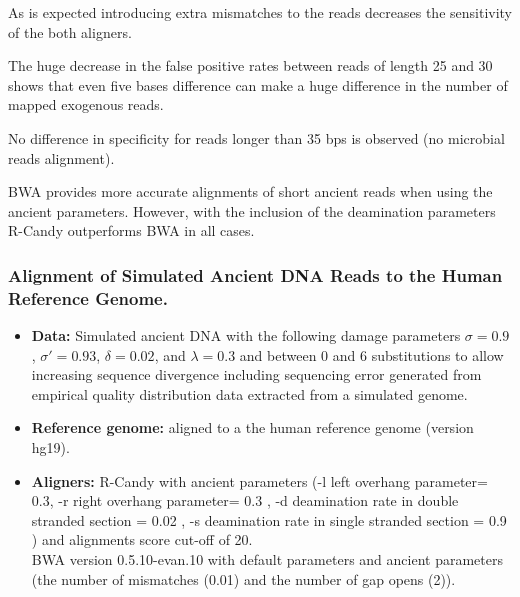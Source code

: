 \documentclass[11pt,a4paper]{report}
\begin{document}
As is expected introducing extra mismatches to the reads decreases  
the sensitivity of the both aligners.

The huge decrease in the false positive rates between reads of length 
25 and 30 shows that even five bases difference can make a huge 
difference in the number of mapped exogenous reads.


No difference in specificity for reads longer than 35 bps is observed
(no microbial reads alignment).


BWA provides more accurate alignments of short 
ancient reads when using the ancient parameters. 
However, with the inclusion of the deamination parameters R-Candy 
outperforms BWA in all cases.



\subsubsection{Alignment of Simulated Ancient DNA Reads to the Human Reference Genome.}
\label{Alignment of Simulated Ancient DNA Reads to the Human Reference Genome.}
 
 \begin{itemize}
 
    \item \textbf{Data:} Simulated ancient DNA 
     with the following damage parameters $ \sigma = 0.9$, 
    $ \sigma\prime = 0.93 $, $\delta = 0.02 $,  and $\lambda = 0.3 $ and 
    between 0 and 6 substitutions to allow increasing sequence divergence
    including sequencing error generated from empirical quality distribution data
    extracted from a simulated genome.
  
   \item \textbf{Reference genome:} aligned to a the human reference genome (version hg19).

 
    \item \textbf{Aligners:} 
R-Candy with ancient parameters 
(-l left overhang parameter= 0.3, -r right overhang parameter= 0.3 , 
-d deamination rate in double stranded section = 0.02 , 
-s deamination rate in single stranded section = 0.9 )
 and alignments score cut-off of 20. \\
BWA version 0.5.10-evan.10 with default parameters and ancient parameters 
\cite{green2010draft} (the number of mismatches 
(0.01) and the number of gap opens (2)).
 
  \end{itemize}
 
\end{document}
